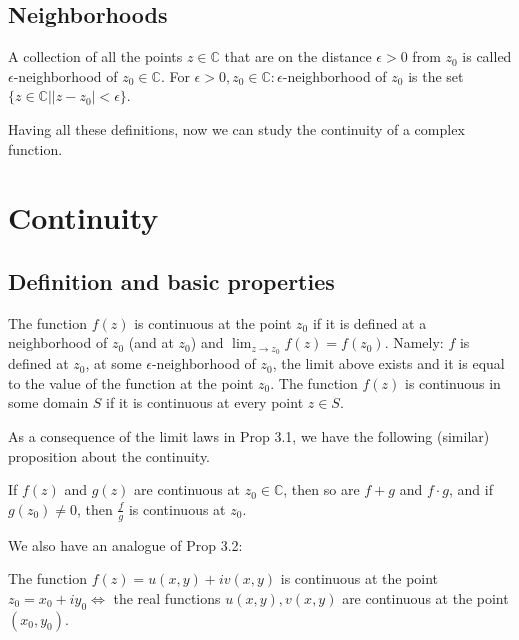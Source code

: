 \subsection{Neighborhoods}

\begin{definition} \label{definition:4.6} A collection of all the points $z \in \mathbb{C}$ that are on the distance $\epsilon > 0$ from $z_0$ is called $\epsilon$-neighborhood of $z_0 \in \mathbb{C}$. For $\epsilon > 0, z_0 \in \mathbb{C}: \epsilon$-neighborhood of $z_0$ is the set $\{z \in \mathbb{C} | |z - z_0| < \epsilon\}$.
\end{definition}

Having all these definitions, now we can study the continuity of a complex function.

\section{Continuity}

\subsection{Definition and basic properties}

\begin{definition}\label{definition:5.1} The function $f(z)$ is continuous at the point $z_0$ if it is defined at a neighborhood of $z_0$ (and at $z_0$) and $\lim_{z\to z_0} f(z) = f(z_0)$.
Namely: $f$ is defined at $z_0$, at some $\epsilon$-neighborhood of $z_0$, the limit above exists and it is equal to the value of the function at the point $z_0$.
The function $f(z)$ is continuous in some domain $S$ if it is continuous at every point $z \in S$.
\end{definition}


As a consequence of the limit laws in Prop 3.1, we have the following (similar) proposition about the continuity.
\begin{proposition}\label{proposition:5.1} If $f(z)$ and $g(z)$ are continuous at $z_0 \in \mathbb{C}$, then so are $f+g$ and $f\cdot g$, and if $g(z_0) \neq 0$, then $\frac{f}{g}$ is continuous at $z_0$.
\end{proposition}

We also have an analogue of Prop 3.2:

\begin{proposition}\label{proposition:5.2} The function $f(z) = u(x,y) + iv(x,y)$ is continuous at the point $z_0 = x_0 + iy_0 \iff$ the real functions $u(x,y), v(x,y)$ are continuous at the point $(x_0, y_0)$.
\end{proposition}

